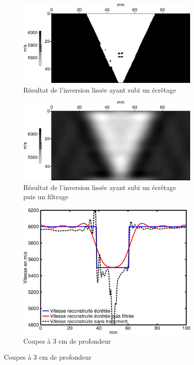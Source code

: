 \documentclass[a4paper,11pt]{report} %
\newenvironment{changemargin}[2]{\begin{list}{}{%
\setlength{\topsep}{0pt}%
\setlength{\leftmargin}{0pt}%
\setlength{\rightmargin}{0pt}%
\setlength{\listparindent}{\parindent}%
\setlength{\itemindent}{\parindent}%
\setlength{\parsep}{0pt plus 1pt}%
\addtolength{\leftmargin}{#1}%
\addtolength{\rightmargin}{#2}%
\setlength{\textwidth}{21cm}
}\item }{\end{list}}
\begin{document}
\begin{figure}[!h]
\begin{changemargin}{-2cm}{-2cm}
	\centering
    \begin{subfigure}[b]{0.3\textwidth}
 		\includegraphics[width=\textwidth]{img/vp_ecrete.png}
 		\caption{Résultat de l'inversion lissée ayant subi un écrêtage}
 	\end{subfigure}
 	\begin{subfigure}[b]{0.3\textwidth}
 		\includegraphics[width=\textwidth]{img/vp_ecrete_filtre.png}
 		\caption{Résultat de l'inversion lissée ayant subi un écrêtage puis un filtrage}
 	\end{subfigure}\begin{subfigure}[b]{0.3\textwidth}
 		\includegraphics[width=\textwidth]{img/coupe_ecrete_filtre.png}
 		\caption{Coupes à 3 cm de profondeur}
 	\end{subfigure} 
\end{changemargin}	
\end{figure}
\end{document}
